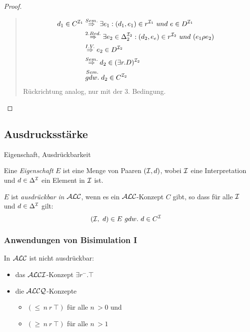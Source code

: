 \begin{proof}
\begin{quote}
\begin{equation}
\begin{split}
d_{1} \in C^{\mathcal{I}_{1}} &\stackrel{Sem.}{\Rightarrow} \exists e_1 : (d_1,e_1) \in r^{\mathcal{I}_1}\ und\ e \in D^{\mathcal{I}_1}\\
&\stackrel{2.Bed.}{\Rightarrow} \exists e_2 \in \Delta_2^{\mathcal{I}_2}: (d_2,e_e) \in r^{\mathcal{I}_2}\ und\ (e_1 \rho e_2) \\
&\stackrel{I.V.}{\Rightarrow} e_2 \in D^{\mathcal{I}_2} \\
&\stackrel{Sem.}{\Rightarrow} d_{2} \in (\exists r.D)^{\mathcal{I}_2} \\
&\stackrel{Sem.}{gdw.} d_2 \in C^{\mathcal{I}_{2}}
\end{split}
\end{equation}
Rückrichtung analog, nur mit der 3. Bedingung.
\end{quote}
\end{proof}

\subsection{Ausdrucksstärke}\label{ausdrucksstuxe4rke}

\begin{definition}{Eigenschaft, Ausdrückbarkeit}

Eine \emph{Eigenschaft} $E$ ist eine Menge von Paaren $(\mathcal{I},d)$, wobei
$\mathcal{I}$ eine Interpretation und $d \in \Delta^{\mathcal{I}}$ ein Element in $\mathcal{I}$ ist.

$E$ ist \emph{ausdrückbar in $\mathcal{A}\mathcal{L}\mathcal{C}$}, wenn es ein $\mathcal{A}\mathcal{L}\mathcal{C}$-Konzept $C$
gibt, so dass für alle $\mathcal{I}$ und $d \in \Delta^{\mathcal{I}}$ gilt:
$$\left( \mathcal{I},\ d \right) \in E\ gdw.\ d \in C^{\mathcal{I}}$$
\end{definition}

\subsubsection{Anwendungen von Bisimulation I}\label{theorem-3.4}

\begin{theorem}
In $\mathcal{A}\mathcal{L}\mathcal{C}$ ist nicht ausdrückbar: 
\begin{itemize}
\item das $\mathcal{A}\mathcal{L}\mathcal{C}\mathcal{I}$-Konzept $\exists r^{-}.\top$ 
\item die $\mathcal{A}\mathcal{L}\mathcal{C}\mathcal{Q}$-Konzepte
\begin{itemize}
  \item $(\leq\ n\ r\ \top)$ für alle $n\ > 0$ und
  \item $(\geq\ n\ r\ \top)$ für alle $n\ > 1$
\end{itemize}
\end{itemize}
\end{theorem}

